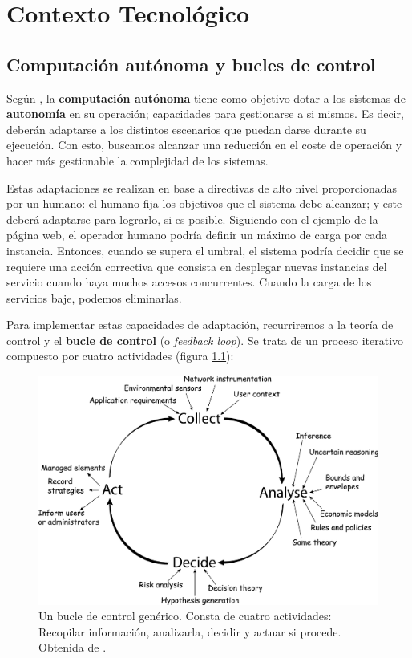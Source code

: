 \chapter{Contexto Tecnológico}
\label{chap:contexto_tecnologico}

\section{Computación autónoma y bucles de control}

Según \cite{ibmcorporationArchitecturalBlueprintAutonomic2006}, la \textbf{computación autónoma} tiene como objetivo dotar a los sistemas de \textbf{autonomía} en su operación; capacidades para gestionarse a si mismos. Es decir, deberán adaptarse a los distintos escenarios que puedan darse durante su ejecución. Con esto, buscamos alcanzar una reducción en el coste de operación y hacer más gestionable la complejidad de los sistemas.

Estas adaptaciones se realizan en base a directivas de alto nivel proporcionadas por un humano: el humano fija los objetivos que el sistema debe alcanzar; y este deberá adaptarse para lograrlo, si es posible. Siguiendo con el ejemplo de la página web, el operador humano podría definir un máximo de carga por cada instancia. Entonces, cuando se supera el umbral, el sistema podría decidir que se requiere una acción correctiva que consista en desplegar nuevas instancias del servicio cuando haya muchos accesos concurrentes. Cuando la carga de los servicios baje, podemos eliminarlas.

Para implementar estas capacidades de adaptación, recurriremos a la teoría de control y el \textbf{bucle de control} (o \emph{feedback loop}). \cite{brunEngineeringSelfAdaptiveSystems2009} Se trata de un proceso iterativo compuesto por cuatro actividades (figura \ref{fig:bucle-control}):

\begin{figure}[h]
  \centering
  \includegraphics[scale=0.065]{01_introduccion/images/feedback-loop}
  \caption[Un bucle de control genérico. Consta de cuatro actividades: Recopilar información, analizarla, decidir y actuar si procede.]{Un bucle de control genérico. Consta de cuatro actividades: Recopilar información, analizarla, decidir y actuar si procede. Obtenida de \cite{dobsonSurveyAutonomicCommunications2006}.}
  \label{fig:bucle-control}
\end{figure}

